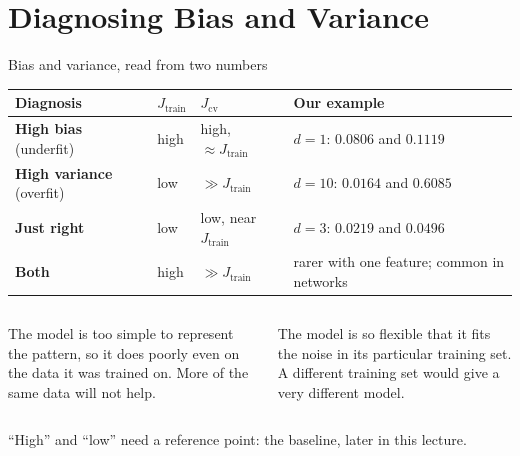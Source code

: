 \documentclass[aspectratio=169,10pt]{beamer}
\begin{document}
\section{Diagnosing Bias and Variance}

\begin{frame}{Bias and variance, read from two numbers}
  \footnotesize
  \renewcommand{\arraystretch}{1.3}
  \begin{tabular}{@{}L{2.4cm}L{3.0cm}L{3.2cm}L{5.0cm}@{}}
    \toprule
    Diagnosis & $J_{\text{train}}$ & $J_{\text{cv}}$ & Our example\\
    \midrule
    \textbf{High bias} (underfit) & high & high, $\approx J_{\text{train}}$
      & $d=1$: $0.0806$ and $0.1119$\\
    \textbf{High variance} (overfit) & low & $\gg J_{\text{train}}$
      & $d=10$: $0.0164$ and $0.6085$\\
    \textbf{Just right} & low & low, near $J_{\text{train}}$
      & $d=3$: $0.0219$ and $0.0496$\\
    \textbf{Both} & high & $\gg J_{\text{train}}$
      & rarer with one feature; common in networks\\
    \bottomrule
  \end{tabular}
  \vspace{3mm}
  \begin{columns}[T,onlytextwidth]
    \begin{column}{0.5\textwidth}
      \begin{defnbox}[Bias]
        \small The model is too simple to represent the pattern, so it does poorly even on
        the data it was trained on. More of the same data will not help.
      \end{defnbox}
    \end{column}
    \begin{column}{0.46\textwidth}
      \begin{defnbox}[Variance]
        \small The model is so flexible that it fits the noise in its particular training
        set. A different training set would give a very different model.
      \end{defnbox}
    \end{column}
  \end{columns}
  \vspace{1mm}
  {\color{cugray} ``High'' and ``low'' need a reference point: the baseline, later in this
  lecture.}
\end{frame}
\end{document}
